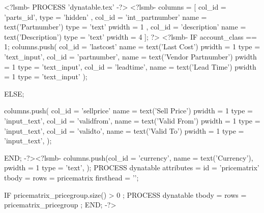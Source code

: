 \documentclass[a4paper]{article}
\begin{document}
<?lsmb- PROCESS 'dynatable.tex' -?>
<?lsmb-
    columns = [ 
              { col_id = 'parts_id',
                  type = 'hidden' },
              { col_id = 'int_partnumber'
                  name = text('Partnumber')
                  type = 'text'
                pwidth = 1
                },
                { col_id = 'description'
                  name = text('Description')
                  type = 'text'
                pwidth = 4
                } ];
?> <?lsmb-
     IF account_class == 1;
         columns.push(
                  {col_id = 'lastcost'
                     name = text('Last Cost') 
                   pwidth = 1
                     type = 'text_input'},
                  {col_id = 'partnumber',
                     name = text('Vendor Partnumber') 
                   pwidth = 1
                     type = 'text_input'},
                  {col_id = 'leadtime',
                     name = text('Lead Time') 
                   pwidth = 1
                     type = 'text_input'}
         );

     ELSE;

         columns.push(
                  {col_id = 'sellprice'
                     name = text('Sell Price') 
                   pwidth = 1
                     type = 'input_text'},
                  {col_id = 'validfrom',
                     name = text('Valid From') 
                   pwidth = 1
                     type = 'input_text'},
                  {col_id = 'validto',
                     name = text('Valid To') 
                   pwidth = 1
                     type = 'input_text'},
         );
                        
     END;
-?><?lsmb-
     columns.push({col_id = 'currency',
                     name = text('Currency'),
                   pwidth = 1
                     type = 'text'},
     );
      PROCESS dynatable
    attributes = { id = 'pricematrix' }
         tbody = { rows = pricematrix }
    firsthead = '';

   IF pricematrix_pricegroup.size() > 0 ;
     PROCESS dynatable
         tbody = { rows = pricematrix_pricegroup };
   END;
-?>
\end{document}
